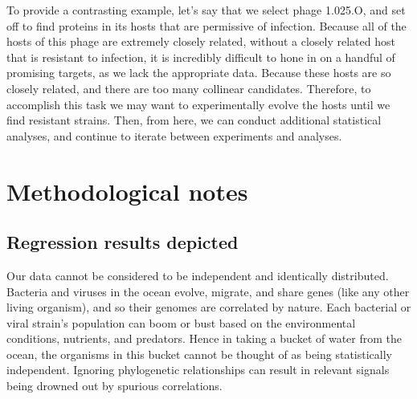 \documentclass[12pt,twoside]{mitthesis-manusdown}
\begin{document}
To provide a contrasting example, let's say that we select phage
1.025.O, and set off to find proteins in its hosts that are permissive
of infection. Because all of the hosts of this phage are extremely
closely related, without a closely related host that is resistant to
infection, it is incredibly difficult to hone in on a handful of
promising targets, as we lack the appropriate data. Because these hosts
are so closely related, and there are too many collinear candidates.
Therefore, to accomplish this task we may want to experimentally evolve
the hosts until we find resistant strains. Then, from here, we can
conduct additional statistical analyses, and continue to iterate between
experiments and analyses.

\section{Methodological notes}\label{methodological-notes}

\subsection{Regression results
depicted}\label{regression-results-depicted}

Our data cannot be considered to be independent and identically
distributed. Bacteria and viruses in the ocean evolve, migrate, and
share genes (like any other living organism), and so their genomes are
correlated by nature. Each bacterial or viral strain's population can
boom or bust based on the environmental conditions, nutrients, and
predators. Hence in taking a bucket of water from the ocean, the
organisms in this bucket cannot be thought of as being statistically
independent. Ignoring phylogenetic relationships can result in relevant
signals being drowned out by spurious correlations.
\end{document}
